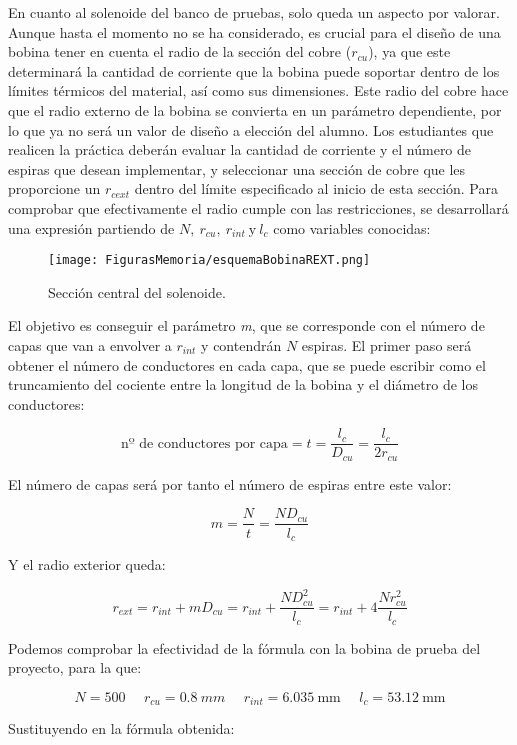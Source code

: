 En cuanto al solenoide del banco de pruebas, solo queda un aspecto por valorar. Aunque hasta el momento no se ha considerado, es crucial para el diseño de una bobina tener en cuenta el radio de la sección del cobre (\(r_{cu}\)), ya que este determinará la cantidad de corriente que la bobina puede soportar dentro de los límites térmicos del material, así como sus dimensiones. Este radio del cobre hace que el radio externo de la bobina se convierta en un parámetro dependiente, por lo que ya no será un valor de diseño a elección del alumno. Los estudiantes que realicen la práctica deberán evaluar la cantidad de corriente y el número de espiras que desean implementar, y seleccionar una sección de cobre que les proporcione un \(r_{cext}\) dentro del límite especificado al inicio de esta sección. Para comprobar que efectivamente el radio cumple con las restricciones, se desarrollará una expresión partiendo de \(N,~r_{cu},~r_{int}~\text{y}~l_c\) como variables conocidas:

\begin{figure}[H]
    \centering
    \texttt{[image: FigurasMemoria/esquemaBobinaREXT.png]}
    \caption{Sección central del solenoide.}
    \label{fig:esquemaBobinaREXT} %
\end{figure}

El objetivo es conseguir el parámetro \textit{m}, que se corresponde con el número de capas que van a envolver a \(r_{int}\) y contendrán \(N\) espiras. El primer paso será obtener el número de conductores en cada capa, que se puede escribir como el truncamiento del cociente entre la longitud de la bobina y el diámetro de los conductores:

\[\text{nº~de~conductores~por~capa}=t=\frac{l_c}{D_{cu}}=\frac{l_c}{2r_{cu}}\]

El número de capas será por tanto el número de espiras entre este valor:

\[m=\frac{N}{t}=\frac{ND_{cu}}{l_c}\]

Y el radio exterior queda:

\[r_{ext}=r_{int}+mD_{cu}=r_{int}+\frac{ND_{cu}^2}{l_c}=r_{int}+4\frac{Nr_{cu}^2}{l_c}\]

Podemos comprobar la efectividad de la fórmula con la bobina de prueba del proyecto, para la que:

\[N=500~~~~~~r_{cu}=0.8~mm~~~~~~r_{int}=6.035~\text{mm}~~~~~~l_c=53.12~\text{mm}\]

Sustituyendo en la fórmula obtenida:

